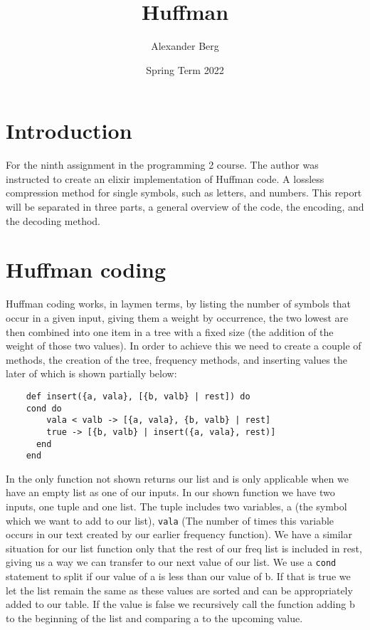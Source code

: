 \documentclass[a4paper,11pt]{article}
\begin{document}
\title{
    \textbf{Huffman}
}
\author{Alexander Berg}
\date{Spring Term 2022}

\maketitle

\section*{Introduction}

For the ninth assignment in the programming 2 course. The author was instructed to create an elixir implementation of Huffman code. A lossless compression method for single symbols, such as letters, and numbers. This report will be separated in three parts, a general overview of the code, the encoding, and the decoding method. 

\section*{Huffman coding}

Huffman coding works, in laymen terms, by listing the number of symbols that occur in a given input, giving them a weight by occurrence, the two lowest are then combined into one item in a tree with a fixed size (the addition of the weight of those two values). 
In order to achieve this we need to create a couple of methods, the creation of the tree, frequency methods, and inserting values the later of which is shown partially below:

\begin{verbatim}
    def insert({a, vala}, [{b, valb} | rest]) do
    cond do
        vala < valb -> [{a, vala}, {b, valb} | rest]
        true -> [{b, valb} | insert({a, vala}, rest)]
      end
    end
\end{verbatim}
In the only function not shown returns our list and is only applicable when we have an empty list as one of our inputs.
In our shown function we have two inputs, one tuple and one list. The tuple includes two variables, a (the symbol which we want to add to our list), {\tt vala} (The number of times this variable occurs in our text created by our earlier frequency function). We have a similar situation for our list function only that the rest of our freq list is included in rest, giving us a way we can transfer to our next value of our list. We use a {\tt cond} statement to split if our value of a is less than our value of b. If that is true we let the list remain the same as these values are sorted and can be appropriately added to our table. If the value is false we recursively call the function adding b to the beginning of the list and comparing a to the upcoming value.
\end{document}
